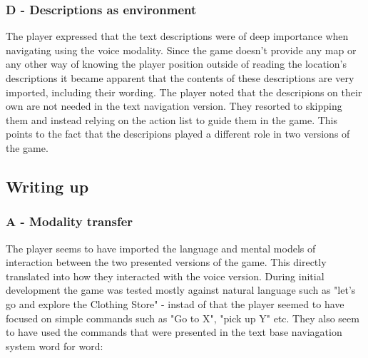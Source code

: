 \subsubsection{D - Descriptions as environment}


The player expressed that the text descriptions were of deep importance when navigating using the voice modality. Since the game doesn't provide any map or any other way of knowing the player position outside of reading the location's descriptions it became apparent that the contents of these descriptions are very imported, including their wording. 
The player noted that the descripions on their own are not needed in the text navigation version. They resorted to skipping them and instead relying on the action list to guide them in the game. This points to the fact that the descripions played a different role in two versions of the game.




\subsection{Writing up}

\subsubsection{A - Modality transfer}


The player seems to have imported the language and mental models of interaction between the two presented versions of the game. This directly translated into how they interacted with the voice version. During initial development the game was tested mostly against natural language such as
"let's go and explore the Clothing Store" - instad of that the player seemed to have focused on simple commands such as "Go to X", "pick up Y" etc. They also seem to have used the commands that were presented in the text base naviagation system word for word:

